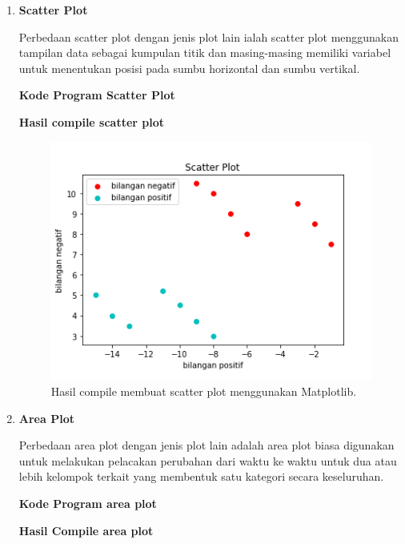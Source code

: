 \begin{enumerate}
	\item \textbf{Scatter Plot}
	
	Perbedaan scatter plot dengan jenis plot lain ialah scatter plot menggunakan tampilan data sebagai kumpulan titik dan masing-masing memiliki variabel untuk menentukan posisi pada sumbu horizontal dan sumbu vertikal.
	
	\textbf{Kode Program Scatter Plot}
	
	
	
	\textbf{Hasil compile scatter plot}
	
	\begin{figure}[H]
		\includegraphics{figures/6/1174021/32.png}
		\centering
		\caption{Hasil compile membuat scatter plot menggunakan Matplotlib.}
	\end{figure}
	
	\item \textbf{Area Plot}
	
	Perbedaan area plot dengan jenis plot lain adalah area plot biasa digunakan untuk melakukan pelacakan perubahan dari waktu ke waktu untuk dua atau lebih kelompok terkait yang membentuk satu kategori secara keseluruhan.
	
	\textbf{Kode Program area plot}
	
	
	
	\textbf{Hasil Compile area plot}
	

\end{enumerate}
